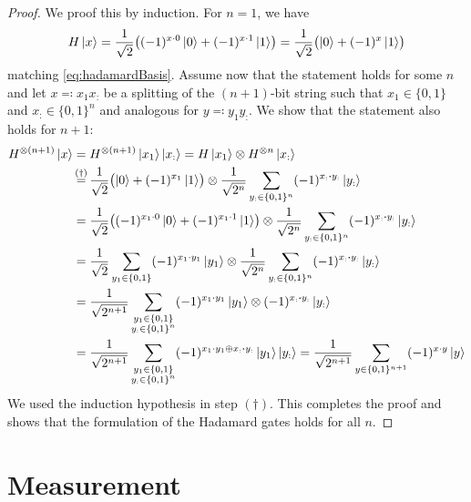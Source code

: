 				\begin{proof}
					We proof this by induction. For \(n = 1\), we have
					\begin{equation}
						H \ket{x}
							= \frac{1}{\sqrt{2}} \bigl( (-1)^{x \cdot 0} \ket{0} + (-1)^{x \cdot 1} \ket{1} \bigr)
							= \frac{1}{\sqrt{2}} \bigl( \ket{0} + (-1)^x \ket{1} \bigr)
					\end{equation}
					matching \eqref{eq:hadamardBasis}. Assume now that the statement holds for some \(n\) and let \( x \eqqcolon x_1 x_: \) be a splitting of the \((n + 1)\)-bit string such that \( x_1 \in \{ 0, 1 \} \) and \( x_: \in \{ 0, 1 \}^n \) and analogous for \( y \eqqcolon y_1 y_: \). We show that the statement also holds for \(n + 1\):
					\begin{align}
						H^{\otimes (n + 1)} \ket{x}
							&= H^{\otimes (n + 1)} \ket{x_1}\ket{x_:}
							 = H \ket{x_1} \otimes H^{\otimes n} \ket{x_:} \\
							&\overset{\mathclap{(\dagger)}}{=} \frac{1}{\sqrt{2}} \bigl( \ket{0} + (-1)^{x_1} \ket{1} \bigr) \otimes \frac{1}{\sqrt{2^n}} \sum_{y_: \in \{ 0, 1 \}^n} (-1)^{x_: \dotproduct y_:} \ket{y_:} \\
							&= \frac{1}{\sqrt{2}} \bigl( (-1)^{x_1 \cdot 0} \ket{0} + (-1)^{x_1 \cdot 1} \ket{1} \bigr) \otimes \frac{1}{\sqrt{2^n}} \sum_{y_: \in \{ 0, 1 \}^n} (-1)^{x_: \dotproduct y_:} \ket{y_:} \\
							&= \frac{1}{\sqrt{2}} \sum_{y_1 \in \{ 0, 1 \}} (-1)^{x_1 \cdot y_1} \ket{y_1} \otimes \frac{1}{\sqrt{2^n}} \sum_{y_: \in \{ 0, 1 \}^n} (-1)^{x_: \dotproduct y_:} \ket{y_:} \\
							&= \frac{1}{\sqrt{2^{n + 1}}} \sum_{\substack{y_1 \in \{ 0, 1 \} \\ y_: \in \{ 0, 1 \}^n}} (-1)^{x_1 \cdot y_1} \ket{y_1} \otimes (-1)^{x_: \dotproduct y_:} \ket{y_:} \\
							&= \frac{1}{\sqrt{2^{n + 1}}} \sum_{\substack{y_1 \in \{ 0, 1 \} \\ y_: \in \{ 0, 1 \}^n}} (-1)^{x_1 \cdot y_1 \oplus x_: \dotproduct y_:} \ket{y_1}\ket{y_:}
							 = \frac{1}{\sqrt{2^{n + 1}}} \sum_{y \in \{ 0, 1 \}^{n + 1}} (-1)^{x \cdot y} \ket{y}
					\end{align}
					We used the induction hypothesis in step \((\dagger)\). This completes the proof and shows that the formulation of the Hadamard gates holds for all \(n\).
				\end{proof}

	\section{Measurement}
		\label{sec:measurement}

